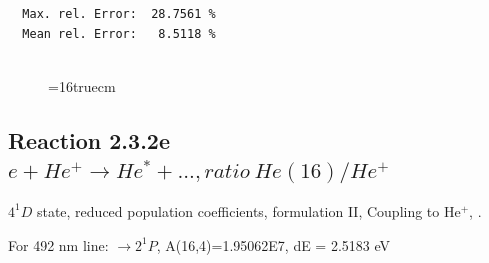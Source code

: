 \documentclass[12pt,dvips]{article}
\begin{document}
\begin{small}
\begin{verbatim}
  Max. rel. Error:  28.7561 %
  Mean rel. Error:   8.5118 %


\end{verbatim}\end{small}
\begin{figure} \label{2.3.2d}
\epsfxsize=16truecm
\end{figure}
\newpage


\subsection{
  Reaction 2.3.2e $e + He^+ \rightarrow He^* + ...,  ratio ~ He(16)/He^+$
}

  $4^1D$ state,
  reduced population coefficients, formulation II,
  Coupling to He$^+$, \cite{kn:Fujimoto}.

  For 492 nm line: $\rightarrow 2^1P$, A(16,4)=1.95062E7, dE = 2.5183 eV
\end{document}
